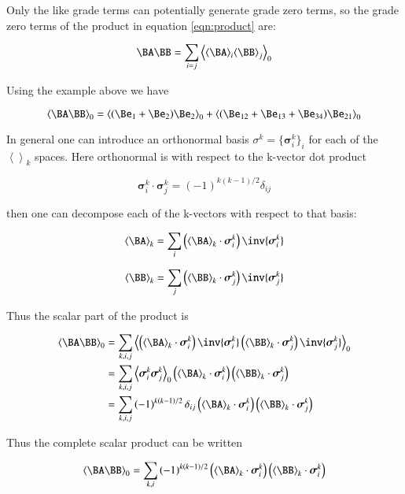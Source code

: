 \documentclass{article}      %
\newcommand{\gpgrade}[2] {{\left\langle{{#1}}\right\rangle}_{#2}}
\newcommand{\gpgradezero}[1] {\gpgrade{#1}{0}}
\newcommand{\Bsigma}[0]{\boldsymbol{\sigma}}
\begin{document}
Only the like grade terms can potentially generate grade zero terms, so the grade zero terms of the product in equation \ref{eqn:product} are:

\begin{equation}\label{eqn:scalarproduct}
\BA \BB 
= \sum_{i=j} \gpgradezero{\gpgrade{\BA}{i} \gpgrade{\BB}{j}}
\end{equation}

Using the example above we have

\[
\gpgradezero{\BA \BB}
= \gpgradezero{ (\Be_1 + \Be_2)\Be_2 }
+ \gpgradezero{ (\Be_{12} + \Be_{13} + \Be_{34})\Be_{21} }
\]

In general one can introduce an orthonormal basis 
$\sigma^k = \{\Bsigma_i^k\}_i$ for each of the $\gpgrade{}{k}$ spaces.
Here orthonormal is with respect to the k-vector dot product

\begin{equation}\label{eqn:orthonormal}
\Bsigma_i^k \cdot \Bsigma_j^k = (-1)^{k(k-1)/2}\delta_{ij}
\end{equation}

then one can decompose each of the k-vectors with respect to that
basis:

\[
\gpgrade{\BA}{k} = \sum_i \left(\gpgrade{\BA}{k} \cdot \Bsigma_i^k\right) \inv{\Bsigma_i^k}
\]

\[
\gpgrade{\BB}{k} = \sum_{j} \left(\gpgrade{\BB}{k} \cdot \Bsigma_{j}^k\right) \inv{\Bsigma_{j}^k}
\]

Thus the scalar part of the product is 

\begin{align*}
\gpgradezero{\BA \BB} 
&= \sum_{k, i, j} \gpgradezero {
\left(\gpgrade{\BA}{k} \cdot \Bsigma_{i}^k\right) \inv{\Bsigma_{i}^k}
\left(\gpgrade{\BB}{k} \cdot \Bsigma_{j}^k\right) \inv{\Bsigma_{j}^k}
} \\
&= \sum_{k, i, j}
\gpgradezero { \Bsigma_{i}^k \Bsigma_{j}^k } 
\left(\gpgrade{\BA}{k} \cdot \Bsigma_{i}^k\right)
\left(\gpgrade{\BB}{k} \cdot \Bsigma_{j}^k\right) \\
&= \sum_{k, i, j}
\left(-1\right)^{k\left(k-1\right)/2} \delta_{ij}
\left(\gpgrade{\BA}{k} \cdot \Bsigma_{i}^k\right)
\left(\gpgrade{\BB}{k} \cdot \Bsigma_{j}^k\right)
\end{align*}

Thus the complete scalar product can be written

\begin{equation}
\gpgradezero{\BA \BB} = \sum_{k, i}
\left(-1\right)^{k\left(k-1\right)/2}
\left(\gpgrade{\BA}{k} \cdot \Bsigma_{i}^k\right)
\left(\gpgrade{\BB}{k} \cdot \Bsigma_{i}^k\right)
\end{equation}
\end{document}
